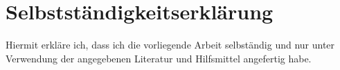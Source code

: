 \section*{Selbstständigkeitserklärung}

Hiermit erkläre ich, dass ich die vorliegende Arbeit selbständig und nur unter
Verwendung der angegebenen Literatur und Hilfsmittel angefertig habe.